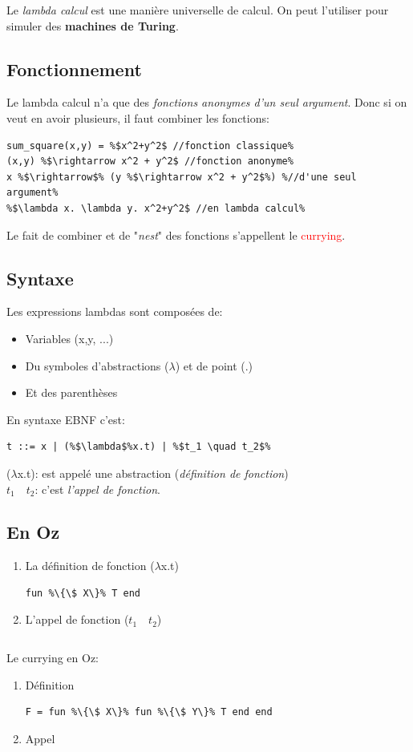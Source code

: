 \documentclass{report}
\begin{document}
Le \textit{lambda calcul} est une manière universelle de calcul. On peut l'utiliser pour simuler des \textbf{machines de Turing}.

\subsection{Fonctionnement}
Le lambda calcul n'a que des \textit{fonctions anonymes d'un seul argument}. Donc si on veut en avoir plusieurs, il faut combiner les fonctions:
\begin{lstlisting}[escapechar=\%]
sum_square(x,y) = %$x^2+y^2$ //fonction classique%
(x,y) %$\rightarrow x^2 + y^2$ //fonction anonyme%
x %$\rightarrow$% (y %$\rightarrow x^2 + y^2$%) %//d'une seul argument%
%$\lambda x. \lambda y. x^2+y^2$ //en lambda calcul%    
\end{lstlisting}
Le fait de combiner et de "\textit{nest}" des fonctions s'appellent le \textcolor{red}{currying}.

\subsection{Syntaxe}
Les expressions lambdas sont composées de:
\begin{itemize}
\item Variables (x,y, ...)
\item Du symboles d'abstractions ($\lambda$) et de point (.)
\item Et des parenthèses
\end{itemize}
En syntaxe EBNF c'est:
\begin{lstlisting}[escapechar=\%]
t ::= x | (%$\lambda$%x.t) | %$t_1 \quad t_2$%
\end{lstlisting}
($\lambda$x.t): est appelé une abstraction (\textit{définition de fonction})\\
$t_1 \quad t_2$: c'est \textit{l'appel de fonction}.

\subsection{En Oz}
\begin{enumerate}
\item La définition de fonction ($\lambda$x.t)
\begin{lstlisting}[escapechar=\%]
fun %\{\$ X\}% T end
\end{lstlisting}
\item L'appel de fonction ($t_1 \quad t_2$)
\begin{lstlisting}[escapechar=\%]
%\{$T_1 \quad T_2$\}%
\end{lstlisting}
\end{enumerate}
Le currying en Oz:
\begin{enumerate}
\item Définition
\begin{lstlisting}[escapechar=\%]
F = fun %\{\$ X\}% fun %\{\$ Y\}% T end end
\end{lstlisting}
\item Appel
\begin{lstlisting}[escapechar=\%]
%\{\{F X\} Y\}%
\end{lstlisting}
\end{enumerate}
\end{document}
